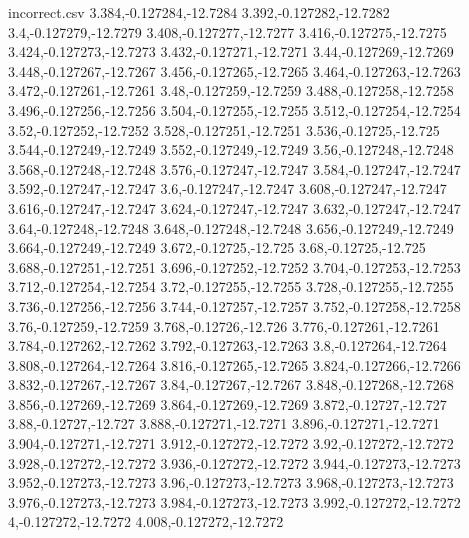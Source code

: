 \begin{filecontents*}{incorrect.csv}
3.384,-0.127284,-12.7284
3.392,-0.127282,-12.7282
3.4,-0.127279,-12.7279
3.408,-0.127277,-12.7277
3.416,-0.127275,-12.7275
3.424,-0.127273,-12.7273
3.432,-0.127271,-12.7271
3.44,-0.127269,-12.7269
3.448,-0.127267,-12.7267
3.456,-0.127265,-12.7265
3.464,-0.127263,-12.7263
3.472,-0.127261,-12.7261
3.48,-0.127259,-12.7259
3.488,-0.127258,-12.7258
3.496,-0.127256,-12.7256
3.504,-0.127255,-12.7255
3.512,-0.127254,-12.7254
3.52,-0.127252,-12.7252
3.528,-0.127251,-12.7251
3.536,-0.12725,-12.725
3.544,-0.127249,-12.7249
3.552,-0.127249,-12.7249
3.56,-0.127248,-12.7248
3.568,-0.127248,-12.7248
3.576,-0.127247,-12.7247
3.584,-0.127247,-12.7247
3.592,-0.127247,-12.7247
3.6,-0.127247,-12.7247
3.608,-0.127247,-12.7247
3.616,-0.127247,-12.7247
3.624,-0.127247,-12.7247
3.632,-0.127247,-12.7247
3.64,-0.127248,-12.7248
3.648,-0.127248,-12.7248
3.656,-0.127249,-12.7249
3.664,-0.127249,-12.7249
3.672,-0.12725,-12.725
3.68,-0.12725,-12.725
3.688,-0.127251,-12.7251
3.696,-0.127252,-12.7252
3.704,-0.127253,-12.7253
3.712,-0.127254,-12.7254
3.72,-0.127255,-12.7255
3.728,-0.127255,-12.7255
3.736,-0.127256,-12.7256
3.744,-0.127257,-12.7257
3.752,-0.127258,-12.7258
3.76,-0.127259,-12.7259
3.768,-0.12726,-12.726
3.776,-0.127261,-12.7261
3.784,-0.127262,-12.7262
3.792,-0.127263,-12.7263
3.8,-0.127264,-12.7264
3.808,-0.127264,-12.7264
3.816,-0.127265,-12.7265
3.824,-0.127266,-12.7266
3.832,-0.127267,-12.7267
3.84,-0.127267,-12.7267
3.848,-0.127268,-12.7268
3.856,-0.127269,-12.7269
3.864,-0.127269,-12.7269
3.872,-0.12727,-12.727
3.88,-0.12727,-12.727
3.888,-0.127271,-12.7271
3.896,-0.127271,-12.7271
3.904,-0.127271,-12.7271
3.912,-0.127272,-12.7272
3.92,-0.127272,-12.7272
3.928,-0.127272,-12.7272
3.936,-0.127272,-12.7272
3.944,-0.127273,-12.7273
3.952,-0.127273,-12.7273
3.96,-0.127273,-12.7273
3.968,-0.127273,-12.7273
3.976,-0.127273,-12.7273
3.984,-0.127273,-12.7273
3.992,-0.127272,-12.7272
4,-0.127272,-12.7272
4.008,-0.127272,-12.7272
\end{filecontents*}

